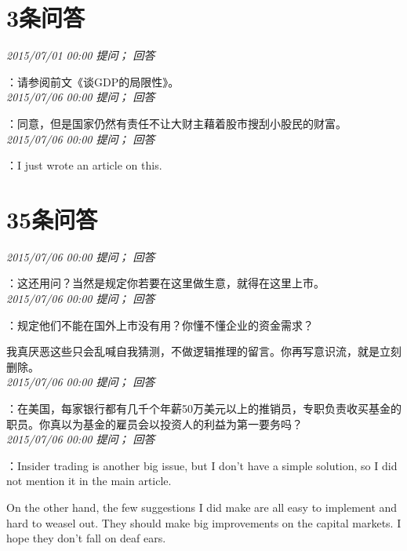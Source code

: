 \documentclass[twocolumn]{ctexart}
\begin{document}
\section{3条问答}

\textit{\hfill\noindent\small 2015/07/01 00:00 提问； 回答}

：请参阅前文《谈GDP的局限性》。\\

\textit{\hfill\noindent\small 2015/07/06 00:00 提问； 回答}

：同意，但是国家仍然有责任不让大财主藉着股市搜刮小股民的财富。\\

\textit{\hfill\noindent\small 2015/07/06 00:00 提问； 回答}

：I just wrote an article on this.\\

\section{35条问答}

\textit{\hfill\noindent\small 2015/07/06 00:00 提问； 回答}

：这还用问？当然是规定你若要在这里做生意，就得在这里上市。\\

\textit{\hfill\noindent\small 2015/07/06 00:00 提问； 回答}

：规定他们不能在国外上市没有用？你懂不懂企业的资金需求？

我真厌恶这些只会乱喊自我猜测，不做逻辑推理的留言。你再写意识流，就是立刻删除。\\

\textit{\hfill\noindent\small 2015/07/06 00:00 提问； 回答}

：在美国，每家银行都有几千个年薪50万美元以上的推销员，专职负责收买基金的职员。你真以为基金的雇员会以投资人的利益为第一要务吗？\\

\textit{\hfill\noindent\small 2015/07/06 00:00 提问； 回答}

：Insider trading is another big issue, but I don't have a simple solution, so I did not mention it in the main article.

On the other hand, the few suggestions I did make are all easy to implement and hard to weasel out. They should make big improvements on the capital markets. I hope they don't fall on deaf ears.\\
\end{document}
